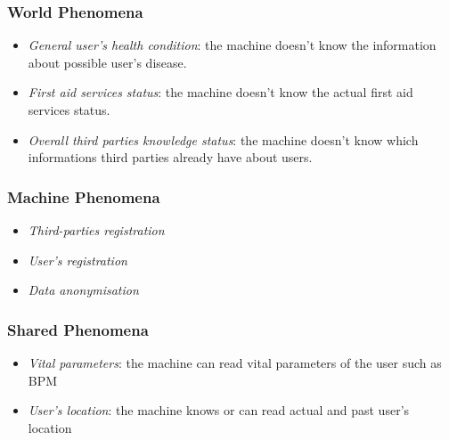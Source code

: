 \documentclass{article}
\begin{document}
\subsubsection{World Phenomena}
\begin{itemize}
	\item \textit{General user’s health condition}: the machine doesn’t know the information about possible user’s disease.
	\item \textit{First aid services status}: the machine doesn’t know the actual first aid services status.
	\item \textit{Overall third parties knowledge status}: the machine doesn’t know which informations third parties already have about users.
\end{itemize}

\subsubsection{Machine Phenomena}
\begin{itemize}
	\item \textit{Third-parties registration}
	\item \textit{User's registration}
	\item \textit{Data anonymisation}
\end{itemize}

\subsubsection{Shared Phenomena}
\begin{itemize}
	\item \textit{Vital parameters}: the machine can read vital parameters of the user such as BPM
	\item \textit{User's location}: the machine knows or can read actual and past user’s location
\end{itemize}
\end{document}

